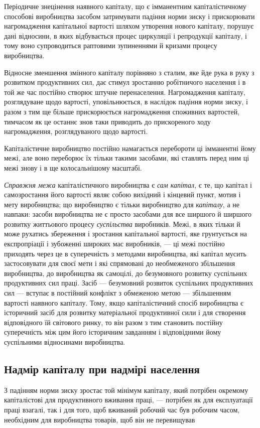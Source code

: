 
Періодичне знецінення наявного капіталу, що є імманентним
капіталістичному способові виробництва засобом затримувати
падіння норми зиску і прискорювати нагромадження капітальної
вартості шляхом утворення нового капіталу, порушує дані відносини,
в яких відбувається процес циркуляції і репродукції
капіталу, і тому воно супроводиться раптовими зупиненнями й
кризами процесу виробництва.

Відносне зменшення змінного капіталу порівняно з сталим,
яке йде рука в руку з розвитком продуктивних сил, дає стимул
зростанню робітничого населення і в той же час постійно створює
штучне перенаселення. Нагромадження капіталу, розглядуване
щодо вартості, уповільнюється, в наслідок падіння норми зиску, і
разом з тим ще більше прискорюється нагромадження споживних
вартостей, тимчасом як це останнє знов таки приводить до прискореного
ходу нагромадження, розглядуваного щодо вартості.

Капіталістичне виробництво постійно намагається перебороти
ці імманентні йому межі, але воно переборює їх тільки такими
засобами, які ставлять перед ним ці межі знову і в ще колосальнішому
масштабі.

\emph{Справжня межа} капіталістичного виробництва є \emph{сам капітал},
є те, що капітал і самозростання його вартості являє собою
вихідний і кінцевий пункт, мотив і мету виробництва; що виробництво
є тільки виробництво для \emph{капіталу}, а не навпаки:
засоби виробництва не є просто засобами для все ширшого й
ширшого розвитку життьового процесу \emph{суспільства} виробників.
Межі, в яких тільки й може рухатись збереження і зростання
капітальної вартості, яке грунтується на експропріації і зубоженні
широких мас виробників, — ці межі постійно приходять
через це в суперечність з методами виробництва, які капітал
мусить застосовувати для своєї мети і які спрямовані до необмеженого
збільшення виробництва, до виробництва як самоцілі, до безумовного
розвитку суспільних продуктивних сил праці. Засіб —
безумовний розвиток суспільних продуктивних сил — вступає
в постійний конфлікт з обмеженою метою — збільшенням вартості
наявного капіталу. Тому, якщо капіталістичний спосіб виробництва
є історичний засіб для розвитку матеріальної продуктивної
сили і для створення відповідного їй світового ринку, то
він разом з тим становить постійну суперечність між цим його
історичним завданням і відповідними йому суспільними відносинами
виробництва.

\subsection{Надмір капіталу при надмірі населення}

З падінням норми зиску зростає той мінімум капіталу, який
потрібен окремому капіталістові для продуктивного вживання
праці, — потрібен як для експлуатації праці взагалі, так і для
того, щоб вживаний робочий час був робочим часом, необхідним
для виробництва товарів, щоб він не перевищував
\parbreak{}  %
